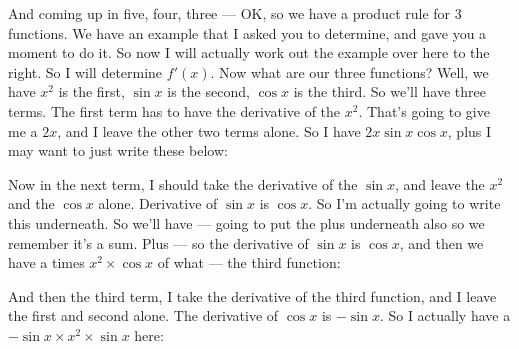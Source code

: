 \documentclass[pdftex, brazil, 12pt, twoside]{article}
\begin{document}
And coming up in five, four, three ---
OK, so we have a product rule for 3 functions.
We have an example that I asked you to determine,
and gave you a moment to do it.
So now I will actually work out the example over here
to the right.
So I will determine $f'(x)$.
Now what are our three functions?
Well, we have $x^2$ is the first, $\sin{x}$ is the second, $\cos{x}$
is the third.
So we'll have three terms.
The first term has to have the derivative of the $x^2$.
That's going to give me a $2x$, and I leave the other two terms
alone. So I have $2x \sin{x} \cos{x}$, plus I may
want to just write these below:

\begin{figure}[H]
  \begin{center}
  \end{center}
\end{figure}

Now in the next term, I should take the derivative of the $\sin{x}$,
and leave the $x^2$ and the $\cos{x}$ alone.
Derivative of $\sin{x}$ is $\cos{x}$.
So I'm actually going to write this underneath.
So we'll have --- going to put the plus underneath also
so we remember it's a sum.
Plus --- so the derivative of $\sin{x}$ is $\cos{x}$,
and then we have a times $x^2 \times \cos{x}$ of what ---
the third function:

\begin{figure}[H]
  \begin{center}
  \end{center}
\end{figure}

And then the third term, I take the derivative
of the third function, and I leave the first and second
alone.
The derivative of $\cos{x}$ is $-\sin{x}$.
So I actually have a $-\sin{x} \times x^2 \times \sin{x}$ here:

\begin{figure}[H]
  \begin{center}
  \end{center}
\end{figure}
\end{document}
